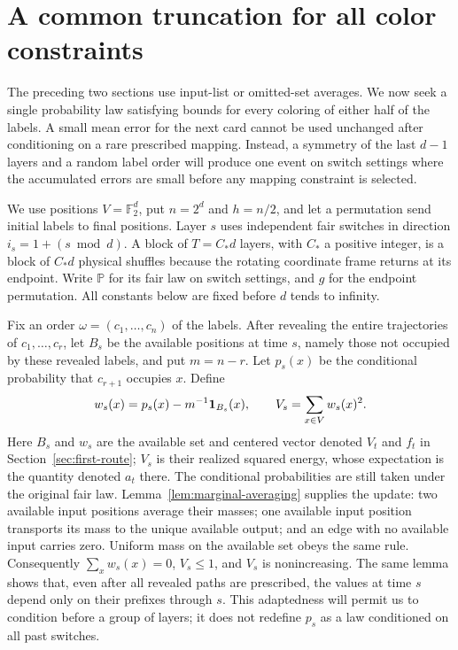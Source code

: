 \section{A common truncation for all color constraints}
\label{sec:c-palettes}

The preceding two sections use input-list or omitted-set averages.
We now seek a single probability law satisfying bounds for every
coloring of either half of the labels. A small mean error for the next
card cannot be used unchanged after conditioning on a rare prescribed
mapping. Instead, a symmetry of the last $d-1$ layers and a random label
order will produce one event on switch settings where the accumulated
errors are small before any mapping constraint is selected.

We use positions $V=\mathbb F_2^d$, put $n=2^d$ and $h=n/2$, and let a
permutation send initial labels to final positions.  Layer $s$ uses
independent fair switches in direction $i_s=1+(s\bmod d)$.  A block of
$T=C_*d$ layers, with $C_*$ a positive integer, is a block of $C_*d$
physical shuffles because the rotating coordinate frame returns at its
endpoint.  Write $\mathbb P$ for its fair law on switch settings, and
$g$ for the endpoint permutation.  All constants below are fixed before
$d$ tends to infinity.

Fix an order $\omega=(c_1,\ldots,c_n)$ of the labels.  After revealing
the entire trajectories of $c_1,\ldots,c_r$, let $B_s$ be the available
positions at time $s$, namely those not occupied by these revealed labels,
and put $m=n-r$.  Let $p_s(x)$ be the conditional
probability that $c_{r+1}$ occupies $x$.  Define
\[
 w_s(x)=p_s(x)-m^{-1}{\bf1}_{B_s}(x),\qquad
 V_s=\sum_{x\in V}w_s(x)^2.
\]
Here $B_s$ and $w_s$ are the available set and centered vector denoted
$V_t$ and $f_t$ in Section~\ref{sec:first-route}; $V_s$ is their realized
squared energy, whose expectation is the quantity denoted $a_t$ there.
The conditional probabilities are still taken under the original fair law.
Lemma~\ref{lem:marginal-averaging} supplies the update: two available
input positions average their masses; one available input position
transports its mass to the unique available output; and an edge with no
available input carries zero.  Uniform mass on the available set obeys
the same rule.  Consequently $\sum_x w_s(x)=0$, $V_s\le1$, and $V_s$ is
nonincreasing.  The same lemma shows that, even after all revealed paths
are prescribed, the values at time $s$ depend only on their prefixes
through $s$.  This adaptedness will permit us to condition before a group
of layers; it does not redefine $p_s$ as a law conditioned on all past
switches.


